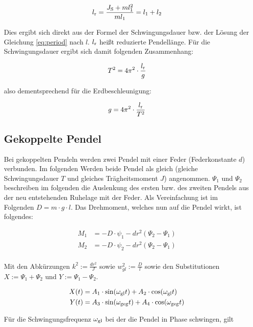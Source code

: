 \begin{equation*}
l_{\mathrm{r}} = \frac{J_{\mathrm{S}}+ml^2_1}{ml_1} = l_1 + l_2
\end{equation*}

Dies ergibt sich direkt aus der Formel der Schwingungsdauer bzw. der Lösung der Gleichung \ref{eq:period} nach $l$. $l_{\mathrm{r}}$ heißt reduzierte Pendellänge. Für die Schwingungsdauer ergibt sich damit folgenden Zusammenhang:

\begin{equation*}
T^2 = 4\pi^2 \cdot \frac{l_{\mathrm{r}}}{g}
\end{equation*}

also dementsprechend für die Erdbeschleunigung:

\begin{equation}
g = 4\pi^2 \cdot \frac{l_{\mathrm{r}}}{T^2}
\label{eq:gravity}
\end{equation}

\subsection{Gekoppelte Pendel}
Bei gekoppelten Pendeln werden zwei Pendel mit einer Feder (Federkonstante $d$) verbunden. Im folgenden Werden beide Pendel als gleich (gleiche Schwingungsdauer $T$ und gleiches Trägheitsmoment $J$) angenommen. $\Psi_1$ und $\Psi_2$ beschreiben im folgenden die Auslenkung des ersten bzw. des zweiten Pendels aus der neu entstehenden Ruhelage mit der Feder. Als Vereinfachung ist im Folgenden $D = m \cdot g \cdot l$. Das Drehmoment, welches nun auf die Pendel wirkt, ist folgendes:

\begin{align*}
M_1 &= -D \cdot \psi_1 - dr^2(\Psi_2 - \Psi_1)\\
M_2 &= -D \cdot \psi_2 - dr^2(\Psi_2 - \Psi_1)\\
\end{align*}

Mit den Abkürzungen $k^2 := \frac{dr^2}{J}$ sowie $w_{gl}^2 := \frac{D}{l}$ sowie den Substitutionen $X := \Psi_1 + \Psi_2$ und $Y := \Psi_1 - \Psi_2$.

\begin{align}
X(t) &= A_1 \cdot \sin (\omega_{\mathrm{gl}}t) + A_2 \cdot \cos (\omega_{\mathrm{gl}}t)\\
Y(t) &= A_3 \cdot \sin (\omega_{\mathrm{geg}}t) + A_4 \cdot \cos (\omega_{\mathrm{geg}}t)
\end{align}

Für die Schwingungsfrequenz $\omega_{\mathrm{gl}}$ bei der die Pendel in Phase schwingen, gilt









